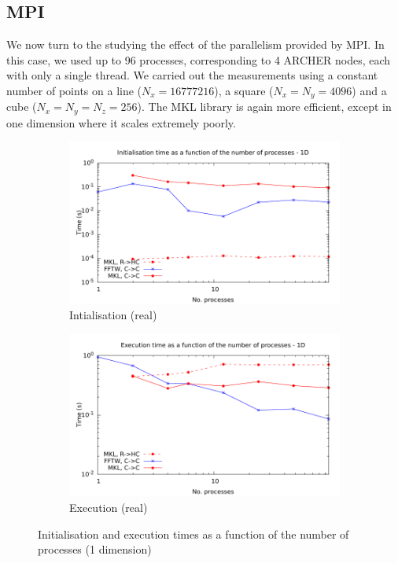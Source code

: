 \documentclass[12pt, a4paper]{article}
\begin{document}
\subsection{MPI}\label{MPI}
We now turn to the studying the effect of the parallelism provided by MPI. In this case, we used up to 96 processes, corresponding to 4 ARCHER nodes, each with only a single thread. We carried out the measurements using a constant number of points on a line ($N_x=16777216$), a square ($N_x=N_y=4096$) and a cube ($N_x=N_y=N_z=256$). The MKL library is again more efficient, except in one dimension where it scales extremely poorly.
\begin{figure}[H]
\captionsetup{width=0.8\linewidth}
\centering
\begin{subfigure}{.5\textwidth}
\centering
\includegraphics[width=.9\linewidth]{graphs/mpi-init-1d.pdf}
\caption{Intialisation (real)}
\label{1DMPII}
\end{subfigure}%
\begin{subfigure}{.5\textwidth}
\centering
\includegraphics[width=.9\linewidth]{graphs/mpi-exec-1d.pdf}
\caption{Execution (real)}
\label{1DMPIE}
\end{subfigure}
\caption{Initialisation and execution times as a function of the number of processes (1 dimension)}
\label{1DMPI}
\end{figure}
\end{document}
